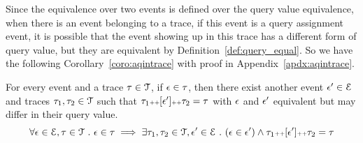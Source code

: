 Since the equivalence over two events is defined over the query value equivalence, 
when there is an event belonging to a trace, 
if this event is a query assignment event, 
it is possible that 
the event showing up in this trace has a different form of query value, 
but they are equivalent by Definition~\ref{def:query_equal}.
So we have the following Corollary~\ref{coro:aqintrace} with proof in Appendix~\ref{apdx:aqintrace}.
\begin{coro}
\label{coro:aqintrace}
For every event and a trace $\mathtt{\tau} \in \mathcal{T}$,
if $\mathtt{\epsilon} \in \mathtt{\tau}$, 
then there exist another event $\mathtt{\epsilon}' \in \mathcal{E}$ and traces $\mathtt{\tau}_1, \mathtt{\tau}_2 \in \mathcal{T}$
such that $\mathtt{\tau}_1 {\scriptscriptstyle ++} [\mathtt{\epsilon}'] {\scriptscriptstyle ++} \mathtt{\tau}_2 = \mathtt{\tau} $
with 
$\mathtt{\epsilon}$ and $\mathtt{\epsilon}'$ equivalent but may differ in their query value.
\[
  \forall \mathtt{\epsilon} \in \mathcal{E}, \mathtt{\tau} \in \mathcal{T} ~.~
\mathtt{\epsilon} \in \mathtt{\tau} \implies \exists \mathtt{\tau}_1, \mathtt{\tau}_2 \in \mathcal{T}, 
\mathtt{\epsilon}' \in \mathcal{E} ~.~ (\mathtt{\epsilon} \in \mathtt{\epsilon}') \land \mathtt{\tau}_1 {\scriptscriptstyle ++} [\mathtt{\epsilon}'] {\scriptscriptstyle ++} \mathtt{\tau}_2 = \mathtt{\tau}  
\]
\end{coro}